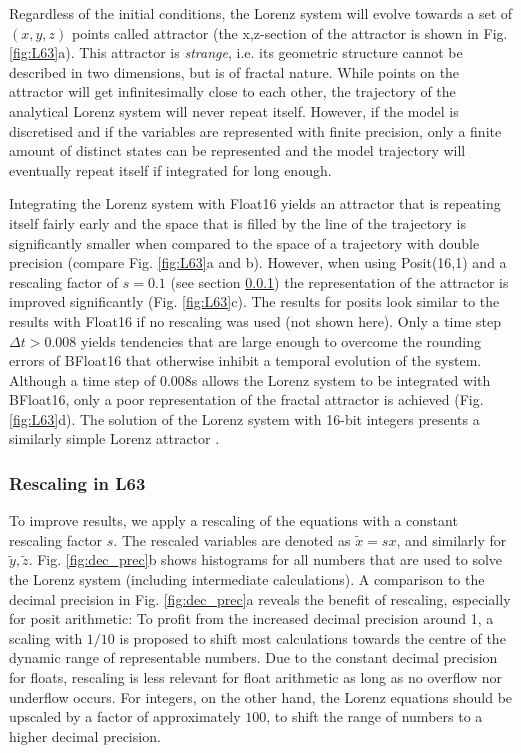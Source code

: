 \documentclass[draft]{agujournal2019}
\begin{document}
Regardless of the initial conditions, the Lorenz system will evolve towards a set of $(x,y,z)$ points called attractor (the x,z-section of the attractor is shown in Fig. \ref{fig:L63}a). This attractor is \emph{strange}, i.e. its geometric structure cannot be described in two dimensions, but is of fractal nature. While points on the attractor will get infinitesimally close to each other, the trajectory of the analytical Lorenz system will never repeat itself. However, if the model is discretised and if the variables are represented with finite precision, only a finite amount of distinct states can be represented and the model trajectory will eventually repeat itself if integrated for long enough.

Integrating the Lorenz system with Float16 yields an attractor that is repeating itself fairly early and the space that is filled by the line of the trajectory is significantly smaller when compared to the space of a trajectory with double precision (compare Fig. \ref{fig:L63}a and b). However, when using Posit(16,1) and a rescaling factor of $s=0.1$ (see section \ref{sec:L63_rescale}) the representation of the attractor is improved significantly (Fig. \ref{fig:L63}c). The results for posits look similar to the results with Float16 if no rescaling was used (not shown here). Only a time step $\Delta t > 0.008$ yields tendencies that are large enough to overcome the rounding errors of BFloat16 that otherwise inhibit a temporal evolution of the system. Although a time step of 0.008s allows the Lorenz system to be integrated with BFloat16, only a poor representation of the fractal attractor is achieved (Fig. \ref{fig:L63}d). The solution of the Lorenz system with 16-bit integers presents a similarly simple Lorenz attractor \cite{Klower2019}.

\subsubsection{Rescaling in L63}
\label{sec:L63_rescale}

To improve results, we apply a rescaling of the equations with a constant rescaling factor $s$. The rescaled variables are denoted as $\tilde{x} = sx$, and similarly for $\tilde{y},\tilde{z}$. Fig. \ref{fig:dec_prec}b shows histograms for all numbers that are used to solve the Lorenz system (including intermediate calculations). A comparison to the decimal precision in Fig. \ref{fig:dec_prec}a reveals the benefit of rescaling, especially for posit arithmetic: To profit from the increased decimal precision around 1, a scaling with $1/10$ is proposed to shift most calculations towards the centre of the dynamic range of representable numbers. Due to the constant decimal precision for floats, rescaling is less relevant for float arithmetic as long as no overflow nor underflow occurs. For integers, on the other hand, the Lorenz equations should be upscaled by a factor of approximately $100$, to shift the range of numbers to a higher decimal precision.
\end{document}
